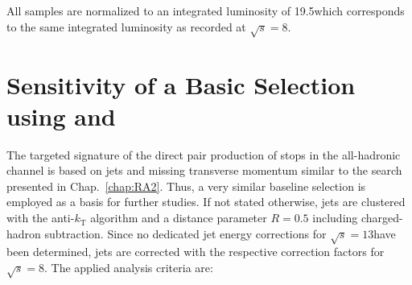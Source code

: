 All samples are normalized to an integrated luminosity of 19.5\fbinv which corresponds to the same integrated luminosity as recorded at $\sqrt{s} =8$\tev.

\section{Sensitivity of a Basic Selection using \HT and \met}
\label{sec:stop_baseline}
The targeted signature of the direct pair production of stops in the all-hadronic channel is based on jets and missing transverse momentum similar to the search presented in Chap.~\ref{chap:RA2}. Thus, a very similar baseline selection is employed as a basis for further studies. If not stated otherwise, jets are clustered with the anti-$k_\mathrm{T}$ algorithm and a distance parameter $R = 0.5$ including charged-hadron subtraction. Since no dedicated jet energy corrections for $\sqrt{s} = 13$\tev have been determined, jets are corrected with the respective correction factors for $\sqrt{s} = 8$\tev. The applied analysis criteria are:
